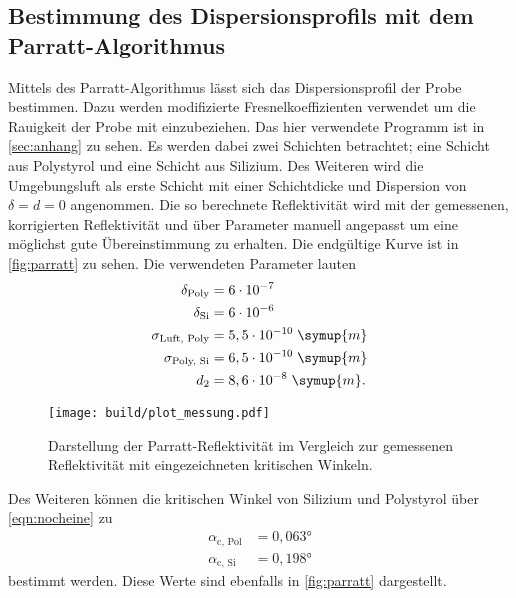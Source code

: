 \subsection{Bestimmung des Dispersionsprofils mit dem Parratt-Algorithmus}
Mittels des Parratt-Algorithmus \cite{parratt} lässt sich das Dispersionsprofil der Probe bestimmen.
Dazu werden modifizierte Fresnelkoeffizienten verwendet um die Rauigkeit der Probe mit 
einzubeziehen. Das hier verwendete Programm ist in \autoref{sec:anhang} zu sehen.
Es werden dabei zwei Schichten betrachtet; eine Schicht aus Polystyrol und eine Schicht 
aus Silizium.
Des Weiteren wird die Umgebungsluft als erste Schicht mit einer Schichtdicke und Dispersion 
von $\delta = d = 0$ angenommen.
Die so berechnete Reflektivität wird mit der gemessenen, korrigierten Reflektivität 
und über Parameter manuell angepasst um eine möglichst gute Übereinstimmung zu erhalten. 
Die endgültige Kurve ist in \autoref{fig:parratt} zu sehen. Die verwendeten Parameter lauten
\begin{align*}
    \delta_{\text{Poly}} &= 6 \cdot 10^{-7} \\
    \delta_{\text{Si}} &= 6 \cdot 10^{-6} \\
    \sigma_{\text{Luft, Poly}} &= 5,5 \cdot 10^{-10} \;\symup{m}  \\ 
    \sigma_{\text{Poly, Si}} &= 6,5 \cdot 10^{-10} \;\symup{m}  \\
    d_2 &= 8,6 \cdot 10^{-8} \;\symup{m}. 
\end{align*}
\begin{figure}
    \centering
    \texttt{[image: build/plot\_messung.pdf]}
    \caption{Darstellung der Parratt-Reflektivität im Vergleich zur gemessenen Reflektivität mit eingezeichneten kritischen Winkeln.}
    \label{fig:parratt}
\end{figure}
Des Weiteren können die kritischen Winkel von Silizium und Polystyrol über \autoref{eqn:nocheine} zu 
\begin{align*}
    \alpha_{\text{c, Pol}} &= 0,063°\\
    \alpha_{\text{c, Si}} &= 0,198°
\end{align*}
bestimmt werden. Diese Werte sind ebenfalls in \autoref{fig:parratt} dargestellt.